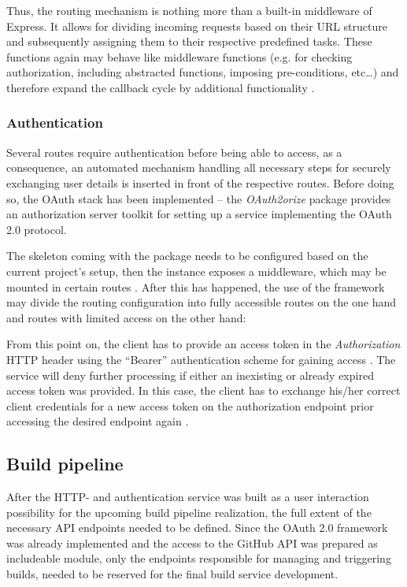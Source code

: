 Thus, the routing mechanism is nothing more than a built-in middleware of Express. It allows for dividing incoming requests based on their URL structure and subsequently assigning them to their respective predefined tasks. These functions again may behave like middleware functions (e.g. for checking authorization, including abstracted functions, imposing pre-conditions, etc\ldots) and therefore expand the callback cycle by additional functionality \cite{ExpressRouter}.

\subsubsection{Authentication}
Several routes require authentication before being able to access, as a consequence, an automated mechanism handling all necessary steps for securely exchanging user details is inserted in front of the respective routes. Before doing so, the OAuth stack has been implemented -- the \emph{OAuth2orize} package provides an authorization server toolkit for setting up a service implementing the OAuth 2.0 protocol.

The skeleton coming with the package needs to be configured based on the current project's setup, then the instance exposes a middleware, which may be mounted in certain routes \cite{OAuth2orizeGitHub}. After this has happened, the use of the framework may divide the routing configuration into fully accessible routes on the one hand and routes with limited access on the other hand:



From this point on, the client has to provide an access token in the \emph{Authorization} HTTP header using the ``Bearer'' authentication scheme for gaining access \cite[5]{RFC6750}. The service will deny further processing if either an inexisting or already expired access token was provided. In this case, the client has to exchange his/her correct client credentials for a new access token on the authorization endpoint prior accessing the desired endpoint again \cite[41]{hardt2012oauth}.


\subsection{Build pipeline}
After the HTTP- and authentication service was built as a user interaction possibility for the upcoming build pipeline realization, the full extent of the necessary API endpoints needed to be defined. Since the OAuth 2.0 framework was already implemented and the access to the GitHub API was prepared as includeable module, only the endpoints responsible for managing and triggering builds, needed to be reserved for the final build service development.

